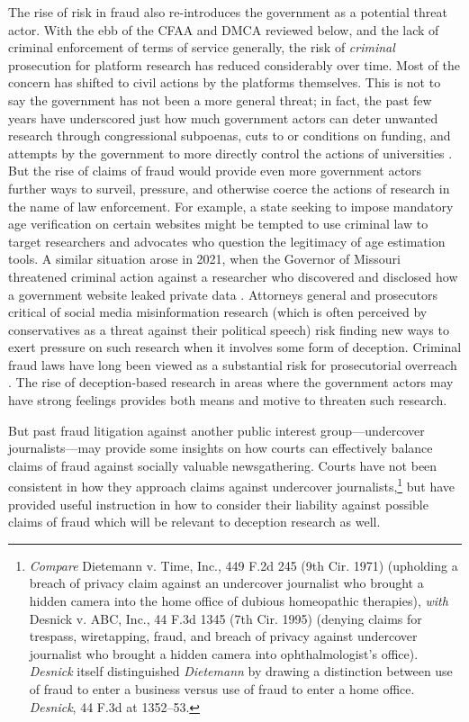 The rise of risk in fraud also re-introduces the government as a potential threat actor. With the ebb of the CFAA and DMCA reviewed below, and the lack of criminal enforcement of terms of service generally, the risk of \textit{criminal} prosecution for platform research has reduced considerably over time. Most of the concern has shifted to civil actions by the platforms themselves. This is not to say the government has not been a more general threat; in fact, the past few years have underscored just how much government actors can deter unwanted research through congressional subpoenas, cuts to or conditions on funding, and attempts by the government to more directly control the actions of universities \cite{calo_american_2024}. But the rise of claims of fraud would provide even more government actors further ways to surveil, pressure, and otherwise coerce the actions of research in the name of law enforcement. For example, a state seeking to impose mandatory age verification on certain websites might be tempted to use criminal law to target researchers and advocates who question the legitimacy of age estimation tools. A similar situation arose in 2021, when the Governor of Missouri threatened criminal action against a researcher who discovered and disclosed how a government website leaked private data \cite{brodkin_missouri_2021}. Attorneys general and prosecutors critical of social media misinformation research (which is often perceived by conservatives as a threat against their political speech) risk finding new ways to exert pressure on such research when it involves some form of deception. Criminal fraud laws have long been viewed as a substantial risk for prosecutorial overreach \cite{podgor_criminal_1999}. The rise of deception-based research in areas where the government actors may have strong feelings provides both means and motive to threaten such research.

But past fraud litigation against another public interest group---undercover journalists---may provide some insights on how courts can effectively balance claims of fraud against socially valuable newsgathering. Courts have not been consistent in how they approach claims against undercover journalists,\footnote{\textit{Compare} Dietemann v. Time, Inc., 449 F.2d 245 (9th Cir. 1971) (upholding a breach of privacy claim against an undercover journalist who brought a hidden camera into the home office of dubious homeopathic therapies), \textit{with} Desnick v. ABC, Inc., 44 F.3d 1345 (7th Cir. 1995) (denying claims for trespass, wiretapping, fraud, and breach of privacy against undercover journalist who brought a hidden camera into ophthalmologist's office). \textit{Desnick} itself distinguished \textit{Dietemann} by drawing a distinction between use of fraud to enter a business versus use of fraud to enter a home office. \textit{Desnick}, 44 F.3d at 1352–53.} but have provided useful instruction in how to consider their liability against possible claims of fraud which will be relevant to deception research as well.

